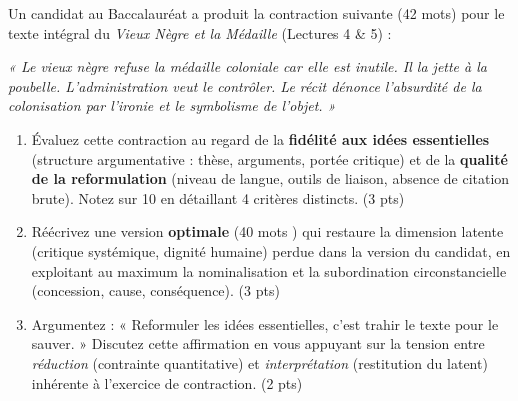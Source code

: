\documentclass[11pt]{article}
\begin{document}
\begin{exercice}
Un candidat au Baccalauréat a produit la contraction suivante (42 mots) pour le texte intégral du \textit{Vieux Nègre et la Médaille} (Lectures 4 \& 5) :

\textit{« Le vieux nègre refuse la médaille coloniale car elle est inutile. Il la jette à la poubelle. L'administration veut le contrôler. Le récit dénonce l'absurdité de la colonisation par l'ironie et le symbolisme de l'objet. »}

\begin{enumerate}
    \item Évaluez cette contraction au regard de la \textbf{fidélité aux idées essentielles} (structure argumentative : thèse, arguments, portée critique) et de la \textbf{qualité de la reformulation} (niveau de langue, outils de liaison, absence de citation brute). Notez sur 10 en détaillant 4 critères distincts. (3 pts)
    \item Réécrivez une version \textbf{optimale} (40 mots ) qui restaure la dimension latente (critique systémique, dignité humaine) perdue dans la version du candidat, en exploitant au maximum la nominalisation et la subordination circonstancielle (concession, cause, conséquence). (3 pts)
    \item Argumentez : « Reformuler les idées essentielles, c'est trahir le texte pour le sauver. » Discutez cette affirmation en vous appuyant sur la tension entre \textit{réduction} (contrainte quantitative) et \textit{interprétation} (restitution du latent) inhérente à l'exercice de contraction. (2 pts)
\end{enumerate}
\end{exercice}
\end{document}
